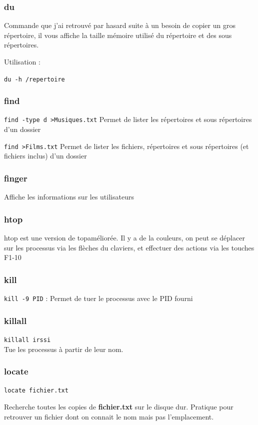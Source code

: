 \documentclass[a4paper,twoside]{article}
\begin{document}
\subsubsection{du}
Commande que j'ai retrouvé par hasard suite à un besoin de copier un gros répertoire, il vous affiche la taille mémoire utilisé du répertoire et des sous répertoires.

Utilisation :

\verb|du -h /repertoire|

\subsubsection{find}
\verb|find -type d >Musiques.txt|
Permet de lister les répertoires et sous répertoires d'un dossier

\verb|find >Films.txt|
Permet de lister les fichiers, répertoires et sous répertoires (et fichiers inclus) d'un dossier

\subsubsection{finger}
Affiche les informations sur les utilisateurs

\subsubsection{htop}\label{sec:htop}
htop est une version de \og top\fg améliorée. Il y a de la couleurs, on peut se déplacer sur les processus via les flèches du claviers, et effectuer des actions via les touches \og F1-10\fg

\subsubsection{kill}
\verb|kill -9 PID| : Permet de tuer le processus avec le PID fourni

\subsubsection{killall}
\verb|killall irssi|\\
Tue les processus à partir de leur nom.

\subsubsection{locate}
\verb|locate fichier.txt|

Recherche toutes les copies de \textbf{fichier.txt} sur le disque dur. Pratique pour retrouver un fichier dont on connait le nom mais pas l'emplacement.
\end{document}
